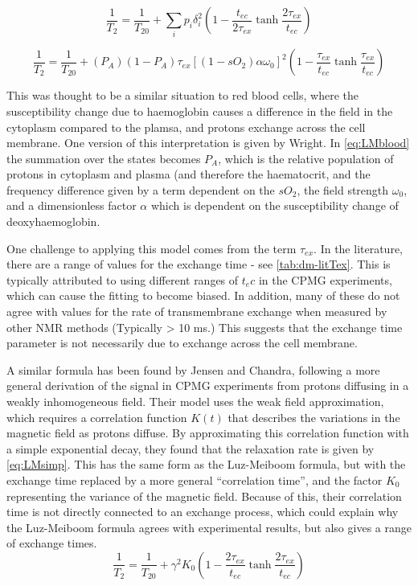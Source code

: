 \begin{equation}
\label{eq:LMchemEx}
\frac{1}{T_2} = \frac{1}{T_{20}} + \sum_i{p_i\delta_i^2} (1 - \frac{t_{ec}}{2\tau_{ex}} \tanh{\frac{2\tau_{ex}}{t_{ec}}})
\end{equation}

\begin{equation}
\label{eq:LMblood}
\frac{1}{T_2} = \frac{1}{T_{20}} +(P_A)(1 - P_A)\tau_{ex} \left[(1-sO_2)\alpha\omega_0\right]^2 \left(1 - \frac{\tau_{ex}}{t_{ec}} \tanh{\frac{\tau_{ex}}{t_{ec}}}\right)
\end{equation}

This was thought to be a similar situation to red blood cells, where the susceptibility change due to haemoglobin causes a difference in the field in the cytoplasm compared to the plamsa, and protons exchange across the cell membrane.
One version of this interpretation is given by Wright\cite{WrightEstimatingoxygensaturation1991}. In \autoref{eq:LMblood} the summation over the states becomes $P_A$, which is the relative population of protons in cytoplasm and plasma (and therefore the haematocrit, and the frequency difference given by a term dependent on the $sO_2$, the field strength $\omega_0$, and a dimensionless factor $\alpha$ which is dependent on the susceptibility change of deoxyhaemoglobin.

One challenge to applying this model comes from the term $\tau_{ex}$.
In the literature, there are a range of values for the exchange time - see \autoref{tab:dm-litTex}.
This is typically attributed to using different ranges of $t_ec$ in the CPMG experiments, which can cause the fitting to become biased.
In addition, many of these do not agree with values for the rate of transmembrane exchange when measured by other NMR methods (Typically > 10 ms\cite{Herbstreviewwaterdiffusion1989}.)
This suggests that the exchange time parameter is not necessarily due to exchange across the cell membrane.

A similar formula has been found by Jensen and Chandra, following a more general derivation of the signal in CPMG experiments from protons diffusing in a weakly inhomogeneous field\cite{JensenNMRrelaxationtissues2000}.
Their model uses the weak field approximation, which requires a correlation function $K(t)$ that describes the variations in the magnetic field as protons diffuse.
By approximating this correlation function with a simple exponential decay, they found that the relaxation rate is given by \autoref{eq:LMsimp}\cite{JensenNMRrelaxationtissues2000}.
This has the same form as the Luz-Meiboom formula, but with the exchange time replaced by a more general ``correlation time'', and the factor $K_0$ representing the variance of the magnetic field.
Because of this, their correlation time is not directly connected to an exchange process, which could explain why the Luz-Meiboom formula agrees with experimental results, but also gives a range of exchange times.
\begin{equation}
\label{eq:LMsimp}
\frac{1}{T_2} = \frac{1}{T_{20}} + \gamma^2 K_0 (1 - \frac{2\tau_{ex}}{t_{ec}} \tanh{\frac{2\tau_{ex}}{t_{ec}}})
\end{equation}

